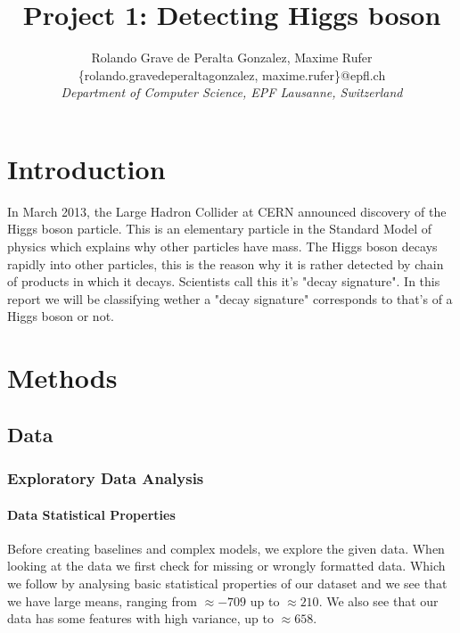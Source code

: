 \documentclass[10pt,conference,compsocconf]{IEEEtran}
\begin{document}
\title{Project 1: Detecting Higgs boson}

\author{
  Rolando Grave de Peralta Gonzalez, Maxime Rufer\\
  \{rolando.gravedeperaltagonzalez, maxime.rufer\}@epfl.ch
  \\
  \textit{Department of Computer Science, EPF Lausanne, Switzerland}
}

\maketitle

\begin{abstract}
\end{abstract}

\section{Introduction}
In March 2013, the Large Hadron Collider at CERN announced discovery of the Higgs boson particle. This is an elementary particle in the Standard Model of physics which explains why other particles have mass. The Higgs boson decays rapidly into other particles, this is the reason why it is rather detected by chain of products in which it decays. Scientists call this it's "decay signature". In this report we will be classifying wether a "decay signature" corresponds to that's of a Higgs boson or not.



\section{Methods}
\subsection{Data}

\subsubsection{Exploratory Data Analysis}
\paragraph{Data Statistical Properties}Before creating baselines and complex models, we explore the given data. When looking at the data we first check for missing or wrongly formatted data. Which we follow by analysing basic statistical properties of our dataset and we see that we have large means, ranging from $\approx -709 $ up to $\approx 210$. We also see that our data has some features with high variance, up to $\approx 658$. \\
\end{document}
